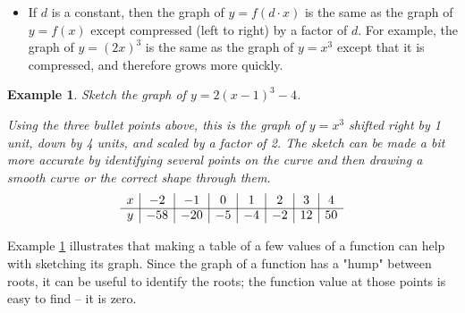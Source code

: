 \documentclass[11pt]{book}               %
\newtheorem{example}{Example}
\begin{document}
\begin{itemize}
\item If $d$ is a constant, then the graph of $y = f(d \cdot x)$ is the same as the graph of $y = f(x)$ except compressed (left to right) by a factor of $d$.  For example, the graph of $y = (2x)^3$ is the same as the graph of $y = x^3$ except that it is compressed, and therefore grows more quickly.

 \begin{center}
 \end{center}


\end{itemize}

\begin{example}
Sketch the graph of $y = 2(x-1)^3 - 4$.

\normalfont
Using the three bullet points above, this is the graph of $y = x^3$ shifted right by 1 unit, down by 4 units, and scaled by a factor of 2.
The sketch can be made a bit more accurate by identifying several points on the curve and then drawing a smooth curve or the correct shape through them.
$$
\begin{array}{c|c|c|c|c|c|c|c}
x & -2 & -1 & 0 & 1 & 2 & 3 & 4\\
\cline{1-8}
y & -58 & -20 & -5 & -4 & -2 &  12 & 50\\
\end{array}
$$

\begin{center}
 \end{center}
 \label{explot}
 
\end{example}

Example \ref{explot} illustrates that making a table of a few values of a function can help with sketching its graph.
Since the graph of a function has a "hump" between roots, it can be useful to identify the roots;  the function value at those points is easy to find -- it is zero.
\end{document}
